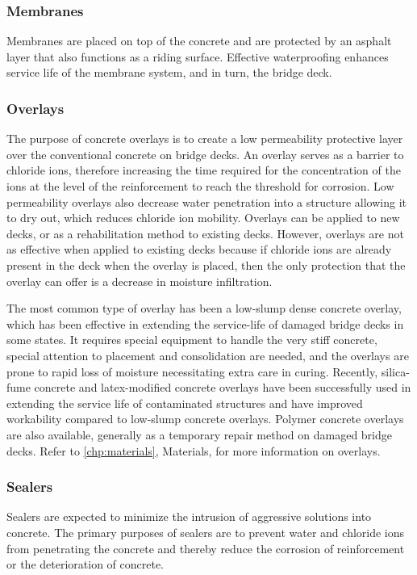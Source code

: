 \subsubsection{Membranes}
Membranes are placed on top of the concrete and are protected by an asphalt layer that also functions as a riding surface. Effective waterproofing enhances service life of the membrane system, and in turn, the bridge deck.

\subsubsection{Overlays}
The purpose of concrete overlays is to create a low permeability protective layer over the conventional concrete on bridge decks. An overlay serves as a barrier to chloride ions, therefore increasing the time required for the concentration of the ions at the level of the reinforcement to reach the threshold for corrosion. Low permeability overlays also decrease water penetration into a structure allowing it to dry out, which reduces chloride ion mobility. Overlays can be applied to new decks, or as a rehabilitation method to existing decks. However, overlays are not as effective when applied to existing decks because if chloride ions are already present in the deck when the overlay is placed, then the only protection that the overlay can offer is a decrease in moisture infiltration.

The most common type of overlay has been a low-slump dense concrete overlay, which has been effective in extending the service-life of damaged bridge decks in some states. It requires special equipment to handle the very stiff concrete, special attention to placement and consolidation are needed, and the overlays are prone to rapid loss of moisture necessitating extra care in curing. Recently, silica-fume concrete and latex-modified concrete overlays have
been successfully used in extending the service life of contaminated structures and have improved workability
compared to low-slump concrete overlays. Polymer concrete overlays are also available, generally as a temporary
repair method on damaged bridge decks. Refer to \cref{chp:materials}, Materials, for more information on overlays.

\subsubsection{Sealers}
Sealers are expected to minimize the intrusion of aggressive solutions into concrete. The primary purposes of
sealers are to prevent water and chloride ions from penetrating the concrete and thereby reduce the corrosion of
reinforcement or the deterioration of concrete.

